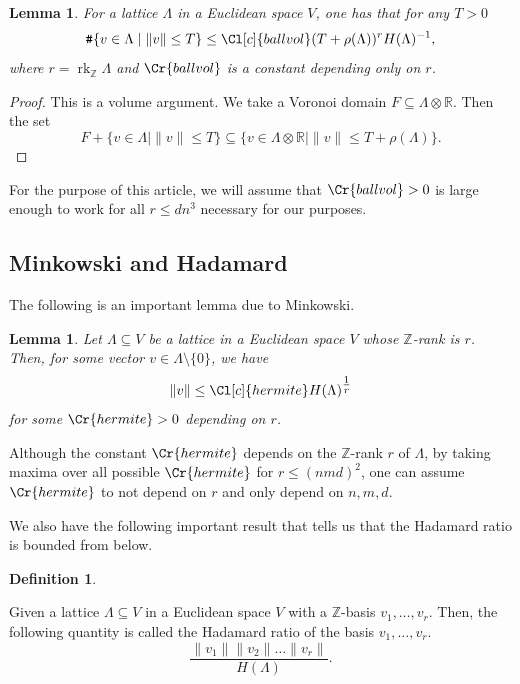 \documentclass{amsart}
\newtheorem{lemma}[theorem]{Lemma}
\theoremstyle{definition}
\newtheorem{definition}[theorem]{Definition}
\theoremstyle{remark}
\DeclareMathOperator{\card}{\texttt{\#}}
\DeclareMathOperator{\rank}{rk}
\begin{document}
\begin{lemma}
    \label{le:ballvol}
    For a lattice $\Lambda$ in a Euclidean space $V$, one has that for any $T > 0$
    \begin{equation}
        \card\{v \in \Lambda \mid \|v\| \leq T \} \leq \Cl[c]{ballvol} (T + \rho(\Lambda))^{r} H(\Lambda)^{-1},
    \end{equation}
    where $r= \rank_{\mathbb{Z}} \Lambda$ and $\Cr{ballvol}$ is a constant depending only on $r$.
\end{lemma}
\begin{proof}
    This is a volume argument. We take a Voronoi domain $F \subseteq \Lambda \otimes \mathbb{R}$. Then the set 
    \begin{equation}
        F + \{v \in \Lambda \mid \|v\| \leq  T\} \subseteq\{v \in  \Lambda \otimes \mathbb{R} \mid \|v\| \leq T + \rho(\Lambda) \}.
    \end{equation}
\end{proof}

For the purpose of this article, we will assume that $\Cr{ballvol}>0$ is large enough to work for all $r \leq dn^{3}$ necessary for our purposes.





\subsection{Minkowski and Hadamard}

The following is an important lemma due to Minkowski. 
\begin{lemma}
    \label{le:minkowski1}
    Let $\Lambda \subseteq V$ be a lattice in a Euclidean space $V$ whose $\mathbb{Z}$-rank is $r$. 
    Then, for some vector $v \in \Lambda \setminus \{0\}$, we have 
    \begin{equation}
        \|v\|\leq  \Cl[c]{hermite} H(\Lambda)^{\tfrac{1}{r}}  
    \end{equation}
    for some $\Cr{hermite}>0$ depending on $r$.
\end{lemma}
Although the constant $\Cr{hermite}$ depends on the $\mathbb{Z}$-rank $r$ of $\Lambda$, by taking maxima over all possible $\Cr{hermite}$ for $r \leq (nmd)^{2}$, one can assume $\Cr{hermite}$ to not depend on $r$ and only depend on $n,m,d$.

We also have the following important result that tells us that the Hadamard ratio is bounded from below. 
\begin{definition}
    \label{de:hadamard_ratio}

    Given a lattice $\Lambda \subseteq V$ in a Euclidean space $V$ with a $\mathbb{Z}$-basis $v_{1},\dots,v_{r}$. Then, the following quantity is called the Hadamard ratio of the basis $v_{1},\dots,v_{r}$.
    \begin{equation}
        \frac{\|v_{1}\| \|v_{2}\| \dots \|v_{r}\|}{H(\Lambda)} .
    \end{equation}
\end{definition}
\end{document}
